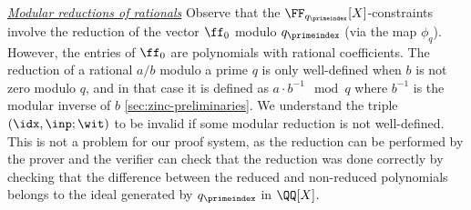\noindent\emph{\underline{Modular reductions of rationals}}
Observe that the $\FF_{q_\primeindex}[X]$-constraints involve the reduction of the vector $\ff_{0}$ modulo $q_\primeindex$ (via the map $\phi_q$). However, the entries of $\ff_0$ are polynomials with rational coefficients. The reduction of a rational $a/b$ modulo a prime $q$ is only well-defined when $b$ is not zero modulo $q$, and in that case it is defined as $a\cdot b^{-1} \mod q$ where $b^{-1}$ is the modular inverse of $b$ \cref{sec:zinc-preliminaries}.  We understand the triple $(\idx,\inp;\wit)$ to be invalid if some modular reduction is not well-defined.  This is not a problem for our proof system, as the reduction can be performed by the prover and the verifier can check that the reduction was done correctly by checking that the difference between the reduced and non-reduced polynomials belongs to the ideal generated by $q_\primeindex$ in $\QQ[X]$.
